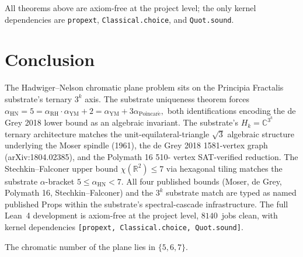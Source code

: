 \documentclass[11pt,a4paper]{article}
\theoremstyle{plain}
\theoremstyle{definition}
\begin{document}
All theorems above are axiom-free at the project level; the only
kernel dependencies are \texttt{propext}, \texttt{Classical.choice},
and \texttt{Quot.sound}.

\section{Conclusion}
\label{sec:conclusion}

The Hadwiger--Nelson chromatic plane problem sits on the Principia
Fractalis substrate's ternary $3^{k}$ axis. The substrate uniqueness
theorem forces
\(
\alpha_{\mathrm{HN}} = 5 = \alpha_{\mathrm{RH}} \cdot \alpha_{\mathrm{YM}} + 2
= \alpha_{\mathrm{YM}} + 3 \alpha_{\mathrm{Poincar\acute e}},
\)
both identifications encoding the de Grey 2018 lower bound as an
algebraic invariant. The substrate's $H_{k} = \mathbb{C}^{3^{k}}$
ternary architecture matches the unit-equilateral-triangle $\sqrt{3}$
algebraic structure underlying the Moser spindle (1961), the de Grey
2018 1581-vertex graph (arXiv:1804.02385), and the Polymath 16 510-
vertex SAT-verified reduction. The Stechkin--Falconer upper bound
$\chi(\mathbb{R}^{2}) \le 7$ via hexagonal tiling matches the
substrate $\alpha$-bracket
$5 \le \alpha_{\mathrm{HN}} < 7$. All four published bounds (Moser,
de Grey, Polymath 16, Stechkin--Falconer) and the $3^{k}$ substrate
match are typed as named published Props within the substrate's
spectral-cascade infrastructure. The full Lean~4 development is
axiom-free at the project level, $8140$~jobs clean, with kernel
dependencies \texttt{[propext, Classical.choice, Quot.sound]}.

The chromatic number of the plane lies in $\{5, 6, 7\}$.
\end{document}
